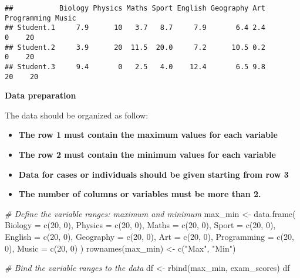 \documentclass[
]{article}
\newenvironment{Shaded}{\begin{snugshade}}{\end{snugshade}}
\newcommand{\AttributeTok}[1]{\textcolor[rgb]{0.77,0.63,0.00}{#1}}
\newcommand{\CommentTok}[1]{\textcolor[rgb]{0.56,0.35,0.01}{\textit{#1}}}
\newcommand{\DecValTok}[1]{\textcolor[rgb]{0.00,0.00,0.81}{#1}}
\newcommand{\FunctionTok}[1]{\textcolor[rgb]{0.00,0.00,0.00}{#1}}
\newcommand{\NormalTok}[1]{#1}
\newcommand{\OtherTok}[1]{\textcolor[rgb]{0.56,0.35,0.01}{#1}}
\newcommand{\StringTok}[1]{\textcolor[rgb]{0.31,0.60,0.02}{#1}}
\providecommand{\tightlist}{%
  \setlength{\itemsep}{0pt}\setlength{\parskip}{0pt}}
\begin{document}
\begin{verbatim}
##           Biology Physics Maths Sport English Geography Art Programming Music
## Student.1     7.9      10   3.7   8.7     7.9       6.4 2.4           0    20
## Student.2     3.9      20  11.5  20.0     7.2      10.5 0.2           0    20
## Student.3     9.4       0   2.5   4.0    12.4       6.5 9.8          20    20
\end{verbatim}

\textbf{Data preparation}

The data should be organized as follow:

\begin{itemize}
\tightlist
\item
  \textbf{The row 1 must contain the maximum values for each variable}
\item
  \textbf{The row 2 must contain the minimum values for each variable}
\item
  \textbf{Data for cases or individuals should be given starting from
  row 3}
\item
  \textbf{The number of columns or variables must be more than 2.}
\end{itemize}

\begin{Shaded}
\begin{Highlighting}[]
\CommentTok{\# Define the variable ranges: maximum and minimum}
\NormalTok{max\_min }\OtherTok{\textless{}{-}} \FunctionTok{data.frame}\NormalTok{(}
  \AttributeTok{Biology =} \FunctionTok{c}\NormalTok{(}\DecValTok{20}\NormalTok{, }\DecValTok{0}\NormalTok{), }\AttributeTok{Physics =} \FunctionTok{c}\NormalTok{(}\DecValTok{20}\NormalTok{, }\DecValTok{0}\NormalTok{), }\AttributeTok{Maths =} \FunctionTok{c}\NormalTok{(}\DecValTok{20}\NormalTok{, }\DecValTok{0}\NormalTok{),}
  \AttributeTok{Sport =} \FunctionTok{c}\NormalTok{(}\DecValTok{20}\NormalTok{, }\DecValTok{0}\NormalTok{), }\AttributeTok{English =} \FunctionTok{c}\NormalTok{(}\DecValTok{20}\NormalTok{, }\DecValTok{0}\NormalTok{), }\AttributeTok{Geography =} \FunctionTok{c}\NormalTok{(}\DecValTok{20}\NormalTok{, }\DecValTok{0}\NormalTok{),}
  \AttributeTok{Art =} \FunctionTok{c}\NormalTok{(}\DecValTok{20}\NormalTok{, }\DecValTok{0}\NormalTok{), }\AttributeTok{Programming =} \FunctionTok{c}\NormalTok{(}\DecValTok{20}\NormalTok{, }\DecValTok{0}\NormalTok{), }\AttributeTok{Music =} \FunctionTok{c}\NormalTok{(}\DecValTok{20}\NormalTok{, }\DecValTok{0}\NormalTok{)}
\NormalTok{)}
\FunctionTok{rownames}\NormalTok{(max\_min) }\OtherTok{\textless{}{-}} \FunctionTok{c}\NormalTok{(}\StringTok{"Max"}\NormalTok{, }\StringTok{"Min"}\NormalTok{)}

\CommentTok{\# Bind the variable ranges to the data}
\NormalTok{df }\OtherTok{\textless{}{-}} \FunctionTok{rbind}\NormalTok{(max\_min, exam\_scores)}
\NormalTok{df}
\end{Highlighting}
\end{Shaded}
\end{document}
